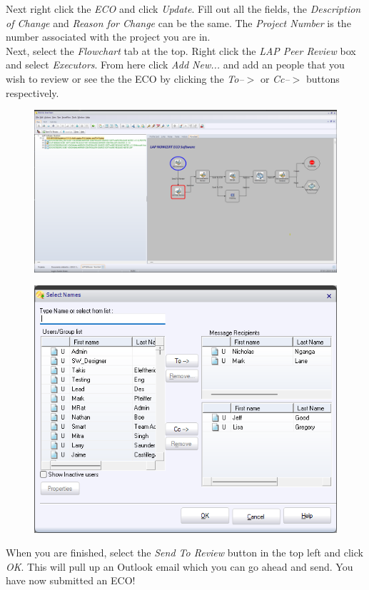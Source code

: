 \documentclass[10pt]{article}
\begin{document}
                Next right click the \emph{ECO} and click \emph{Update}. Fill out all the fields, the \emph{Description of Change} and \emph{Reason for Change} can be the same. The \emph{Project Number} is the number associated with the project you are in. \\
                Next, select the \emph{Flowchart} tab at the top. Right click the \emph{LAP Peer Review} box and select \emph{Executors}. From here click \emph{Add New...} and add an people that you wish to review or see the the ECO by clicking the \emph{To--$>$} or \emph{Cc--$>$} buttons respectively.
                \begin{figure}[H]
                    \centerline{\includegraphics[width=\textwidth]{References/ST ECO Flowchart.png}}
                \end{figure}
                \begin{figure}[H]
                    \centerline{\includegraphics[width=\textwidth]{References/ST ECO Select Names.png}}
                \end{figure}
                When you are finished, select the \emph{Send To Review} button in the top left and click \emph{OK}. This will pull up an Outlook email which you can go ahead and send. You have now submitted an ECO!
\end{document}
